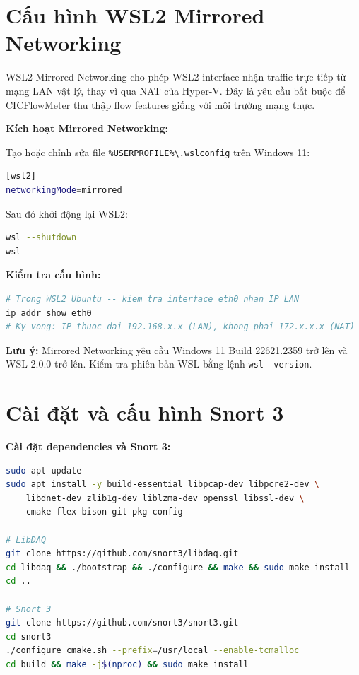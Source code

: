 \documentclass[../DoAn.tex]{subfiles}
\begin{document}
\section{Cấu hình WSL2 Mirrored Networking}
\label{sec:pla-wsl}

WSL2 Mirrored Networking cho phép WSL2 interface nhận traffic trực tiếp từ mạng LAN vật lý, thay vì qua NAT của Hyper-V. Đây là yêu cầu bắt buộc để CICFlowMeter thu thập flow features giống với môi trường mạng thực.

\textbf{Kích hoạt Mirrored Networking:}

Tạo hoặc chỉnh sửa file \texttt{\%USERPROFILE\%\textbackslash.wslconfig} trên Windows 11:

\begin{lstlisting}[language=bash, caption={Cấu hình .wslconfig để bật Mirrored Networking}]
[wsl2]
networkingMode=mirrored
\end{lstlisting}

Sau đó khởi động lại WSL2:

\begin{lstlisting}[language=bash, caption={Khởi động lại WSL2}]
wsl --shutdown
wsl
\end{lstlisting}

\textbf{Kiểm tra cấu hình:}

\begin{lstlisting}[language=bash, caption={Kiểm tra IP LAN trên WSL2}]
# Trong WSL2 Ubuntu -- kiem tra interface eth0 nhan IP LAN
ip addr show eth0
# Ky vong: IP thuoc dai 192.168.x.x (LAN), khong phai 172.x.x.x (NAT)
\end{lstlisting}

\textbf{Lưu ý:} Mirrored Networking yêu cầu Windows 11 Build 22621.2359 trở lên và WSL 2.0.0 trở lên. Kiểm tra phiên bản WSL bằng lệnh \texttt{wsl --version}.

\section{Cài đặt và cấu hình Snort 3}
\label{sec:pla-snort}

\textbf{Cài đặt dependencies và Snort 3:}

\begin{lstlisting}[language=bash, caption={Cài đặt Snort 3 từ source trên Ubuntu 22.04}]
sudo apt update
sudo apt install -y build-essential libpcap-dev libpcre2-dev \
    libdnet-dev zlib1g-dev liblzma-dev openssl libssl-dev \
    cmake flex bison git pkg-config

# LibDAQ
git clone https://github.com/snort3/libdaq.git
cd libdaq && ./bootstrap && ./configure && make && sudo make install
cd ..

# Snort 3
git clone https://github.com/snort3/snort3.git
cd snort3
./configure_cmake.sh --prefix=/usr/local --enable-tcmalloc
cd build && make -j$(nproc) && sudo make install
\end{lstlisting}
\end{document}
